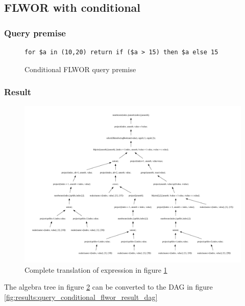 \subsection{FLWOR with conditional}
\label{sect:results:algebra:generated:conditional_flwor}
\subsubsection{Query premise}
\begin{figure}[!htp]
\begin{center}
\begin{Verbatim}
for $a in (10,20) return if ($a > 15) then $a else 15
\end{Verbatim}
  \caption{Conditional FLWOR query premise}
  \label{fig:results:query_conditional_flwor}
\end{center}
\end{figure}

\subsubsection{Result}
\begin{figure}[!htp]
\begin{center}
  \includegraphics[width=1.0\textwidth]{img/graphs/td_impl_flwor_ifthenelse_xq_relalg}
  \caption{Complete translation of expression in figure
  \ref{fig:results:query_conditional_flwor}}
  \label{fig:results:query_conditional_flwor_result}
\end{center}
\end{figure}

The algebra tree in figure \ref{fig:results:query_conditional_flwor_result} can
be converted to the DAG in figure
\ref{fig:results:query_conditional_flwor_result_dag}

